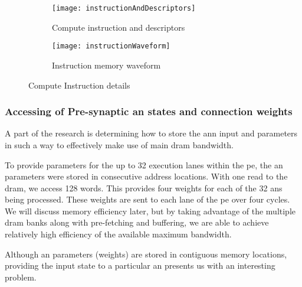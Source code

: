 \begin{figure}
\centering
  \begin{subfigure}{.95\textwidth}
    \centering
    \mbox{\texttt{[image: instructionAndDescriptors]}}
    \captionsetup{justification=centering, skip=6pt}
    \caption{Compute instruction and descriptors}
    \label{fig:Instruction and Descriptors}
  \end{subfigure}%

\bigskip

  \vspace{-35pt}
  \begin{subfigure}{1\textwidth}
    \centering
    \vspace{40pt}
    \texttt{[image: instructionWaveform]}
    \captionsetup{justification=centering, skip=10pt}
    \caption{Instruction memory waveform}
    \label{fig:Instruction memory waveform}
  \end{subfigure}%
\captionsetup{justification=centering, skip=16pt}
\caption{Compute Instruction details}
\label{fig:Instruction Details}
\end{figure}



\subsubsection{Accessing of Pre-synaptic \ac{an} states and connection weights}
\label{sec:AccessingANStates}

A part of the research is determining how to store the \ac{ann} input and parameters in such a way to effectively make use of main \ac{dram} bandwidth. 

To provide parameters for the up to 32 execution lanes within the \ac{pe}, the \ac{an} parameters were stored in consecutive address locations. 
With one read to the \ac{dram}, we access 128 words. This provides four weights for each of the 32 \acp{an} being processed. 
These weights are sent to each lane of the \ac{pe} over four cycles. 
We will discuss memory efficiency later, but by taking advantage of the multiple \ac{dram} banks along with pre-fetching and buffering, we are able to achieve relatively high efficiency of the available maximum bandwidth.

Although \ac{an} parameters (weights) are stored in contiguous memory locations, providing the input state to a particular \ac{an} presents us with an interesting problem.

